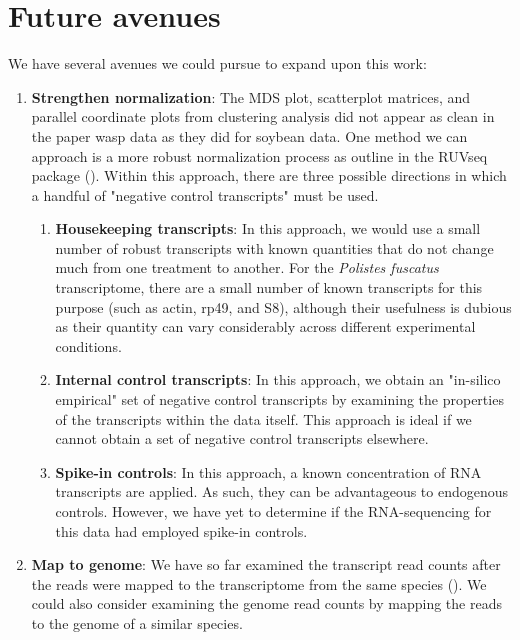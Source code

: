 \documentclass[11pt,a4paper,oldfontcommands,openany]{memoir}
\numberwithin{equation}{section} %
\begin{document}
\section{Future avenues}

We have several avenues we could pursue to expand upon this work:

\begin{enumerate}
\item \textbf{Strengthen normalization}: The MDS plot, scatterplot matrices, and parallel coordinate plots from clustering analysis did not appear as clean in the paper wasp data as they did for soybean data. One method we can approach is a more robust normalization process as outline in the RUVseq package (\citealt{ruvseq}). Within this approach, there are three possible directions in which a handful of "negative control transcripts" must be used.

\begin{enumerate}
\item \textbf{Housekeeping transcripts}: In this approach, we would use a small number of robust transcripts with known quantities that do not change much from one treatment to another. For the \textit{Polistes fuscatus} transcriptome, there are a small number of known transcripts for this purpose (such as actin, rp49, and S8), although their usefulness is dubious as their quantity can vary considerably across different experimental conditions.
\item \textbf{Internal control transcripts}: In this approach, we obtain an "in-silico empirical" set of negative control transcripts by examining the properties of the transcripts within the data itself. This approach is ideal if we cannot obtain a set of negative control transcripts elsewhere.
\item \textbf{Spike-in controls}: In this approach, a known concentration of RNA transcripts are applied. As such, they can be advantageous to endogenous controls. However, we have yet to determine if the RNA-sequencing for this data had employed spike-in controls. 
\end{enumerate}

\item \textbf{Map to genome}: We have so far examined the transcript read counts after the reads were mapped to the transcriptome from the same species (\citealt{pw19}). We could also consider examining the genome read counts by mapping the reads to the genome of a similar species.


\end{enumerate}
\end{document}
